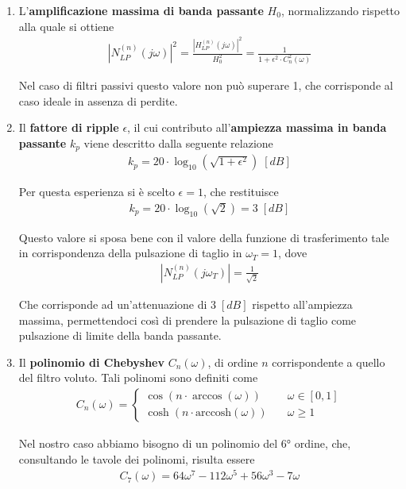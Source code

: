 \documentclass[a4paper,12pt]{report}
\newcommand{\double}[2]{\left\{ \begin{array}{cc}
		#1\\
		#2
	\end{array}
	\right.
}
\begin{document}
\begin{enumerate}
	\item L'\textbf{amplificazione massima di banda passante} $H_0$, normalizzando rispetto alla quale si ottiene
	\begin{align}
	|N^{(n)}_{LP}(j\omega)|^2 = \frac{|H^{(n)}_{LP}(j\omega)|^2}{H_0^2} = \frac{1}{1 + \epsilon^2 \cdot C_n^2(\omega)}
	\end{align}
	
	Nel caso di filtri passivi questo valore non può superare 1, che corrisponde al caso ideale in assenza di perdite. 
	
	\item Il \textbf{fattore di ripple} $\epsilon$, il cui contributo all'\textbf{ampiezza massima in banda passante} $k_p$ viene descritto dalla seguente relazione
	\begin{align}
	k_p = 20 \cdot \log_{10} (\sqrt{1 + \epsilon^2}) \; [dB] 
	\end{align}
	
	Per questa esperienza si è scelto $\epsilon =1$, che restituisce
	\begin{align}
	k_p = 20 \cdot \log_{10} (\sqrt{2}) = 3 \; [dB] 
	\end{align}
	
	Questo valore si sposa bene con il valore della funzione di trasferimento tale in corrispondenza della pulsazione di taglio in $\omega_T=1$, dove
	\begin{align}
	|N^{(n)}_{LP}(j\omega_T)| = \frac{1}{\sqrt{2}}
	\end{align}
	
	Che corrisponde ad un'attenuazione di $3 \; [dB] $ rispetto all'ampiezza massima, permettendoci così di prendere la pulsazione di taglio come pulsazione di limite della banda passante.
	
	\item Il \textbf{polinomio di Chebyshev} $C_n(\omega)$, di ordine $n$ corrispondente a quello del filtro voluto. Tali polinomi sono definiti come
	\begin{align}
	C_n(\omega) = \double{\cos (n \cdot \arccos (\omega )) \quad &\omega \in [0,1]}{\cosh (n \cdot \text{arccosh} (\omega )) \quad &\omega \geq 1}
	\end{align}
	
	Nel nostro caso abbiamo bisogno di un polinomio del 6° ordine, che, consultando le tavole dei polinomi, risulta essere
	\begin{align}
	C_7(\omega) = 64\omega^7 - 112\omega^5 + 56\omega^3 -7\omega
	\end{align}
	
\end{enumerate}    
\end{document}
